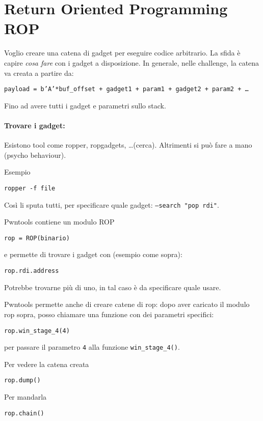 \section{Return Oriented Programming ROP}

Voglio creare una catena di gadget per eseguire codice arbitrario. La sfida è capire \textit{cosa fare} con i gadget a disposizione. In generale, nelle challenge, la catena va creata a partire da: 
\begin{center}
	\texttt{payload = b'A'*buf\_offset + gadget1 + param1 + gadget2 + param2 + \dots}
\end{center}

Fino ad avere tutti i gadget e parametri sullo stack.

\paragraph{Trovare i gadget:} Esistono tool come ropper, ropgadgets, \dots (cerca). Altrimenti si può fare a mano (psycho behaviour).

Esempio 
\begin{center}
	\texttt{ropper -f file}
\end{center}
Così li sputa tutti, per specificare quale gadget: \texttt{--search "pop rdi"}.

Pwntools contiene un modulo ROP
\begin{center}
	\texttt{rop = ROP(binario)}
\end{center}

e permette di trovare i gadget con (esempio come sopra):
\begin{center}
	\texttt{rop.rdi.address}
\end{center}
Potrebbe trovarne più di uno, in tal caso è da specificare quale usare.

Pwntools permette anche di creare catene di rop: dopo aver caricato il modulo rop sopra, posso chiamare una funzione con dei parametri specifici:
\begin{center}
	\texttt{rop.win\_stage\_4(4)}
\end{center}

per passare il parametro \texttt{4} alla funzione \texttt{win\_stage\_4()}.

Per vedere la catena creata
\begin{center}
	\texttt{rop.dump()}
\end{center}

Per mandarla 
\begin{center}
	\texttt{rop.chain()}
\end{center}

